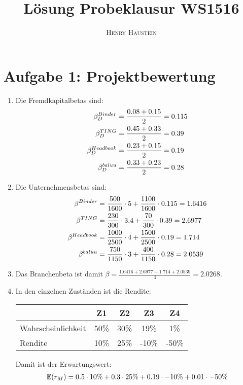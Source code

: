 \documentclass{article}
\title{\textbf{Lösung Probeklausur WS1516}}
\author{\textsc{Henry Haustein}}
\date{}
\newcommand{\E}{\mathbb{E}}
\begin{document}
	\maketitle

	\section*{Aufgabe 1: Projektbewertung}
	\begin{enumerate}[label=(\alph*)]
		\item Die Fremdkapitalbetas sind:
		\begin{align}
			\beta_D^{Binder} &= \frac{0.08 + 0.15}{2} = 0.115 \notag \\
			\beta_D^{TING} &= \frac{0.45 + 0.33}{2} = 0.39 \notag \\
			\beta_D^{Headbook} &= \frac{0.23 + 0.15}{2} = 0.19 \notag \\
			\beta_D^{baluu} &= \frac{0.33 + 0.23}{2} = 0.28 \notag
		\end{align}
		\item Die Unternehmensbetas sind:
		\begin{align}
			\beta^{Binder} &= \frac{500}{1600}\cdot 5 + \frac{1100}{1600} \cdot 0.115 = 1.6416 \notag \\
			\beta^{TING} &= \frac{230}{300}\cdot 3.4 + \frac{70}{300} \cdot 0.39 = 2.6977 \notag \\
			\beta^{Headbook} &= \frac{1000}{2500}\cdot 4 + \frac{1500}{2500} \cdot 0.19 = 1.714 \notag \\
			\beta^{baluu} &= \frac{750}{1150}\cdot 3 + \frac{400}{1150} \cdot 0.28 = 2.0539 \notag
		\end{align}
		\item Das Branchenbeta ist damit $\beta = \frac{1.6416 + 2.6977 + 1.714 + 2.0539}{4} = 2.0268$.
		\item In den einzelnen Zuständen ist die Rendite:
		\begin{center}
			\begin{tabular}{l|c|c|c|c}
				& \textbf{Z1} & \textbf{Z2} & \textbf{Z3} & \textbf{Z4} \\
				\hline
				Wahrscheinlichkeit & 50\% & 30\% & 19\% & 1\% \\
				\hline
				Rendite & 10\% & 25\% & -10\% & -50\%
			\end{tabular}
		\end{center}
		Damit ist der Erwartungswert:
		\begin{align}
			\E(r_M) &= 0.5\cdot10\% + 0.3\cdot 25\% + 0.19\cdot -10\% + 0.01\cdot -50\% \notag \\

\end{align}
\end{enumerate}
\end{document}
